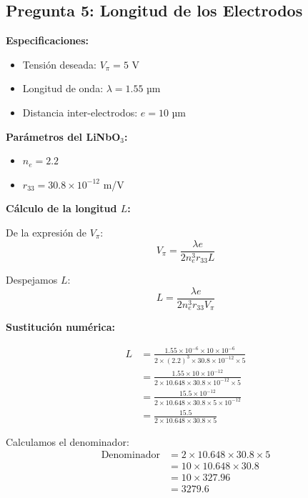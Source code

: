 \documentclass[12pt,a4paper]{article}
\begin{document}
\begin{enumerate}
\subsection{Pregunta 5: Longitud de los Electrodos}

\textbf{Especificaciones:}
\begin{itemize}
    \item Tensión deseada: $V_\pi = 5$ V
    \item Longitud de onda: $\lambda = 1.55$ µm
    \item Distancia inter-electrodos: $e = 10$ µm
\end{itemize}

\textbf{Parámetros del LiNbO$_3$:}
\begin{itemize}
    \item $n_e = 2.2$
    \item $r_{33} = 30.8 \times 10^{-12}$ m/V
\end{itemize}

\textbf{Cálculo de la longitud $L$:}

De la expresión de $V_\pi$:
\begin{equation}
    V_\pi = \frac{\lambda e}{2 n_e^3 r_{33} L}
\end{equation}

Despejamos $L$:
\begin{equation}
    L = \frac{\lambda e}{2 n_e^3 r_{33} V_\pi}
\end{equation}

\textbf{Sustitución numérica:}

\begin{align}
    L &= \frac{1.55 \times 10^{-6} \times 10 \times 10^{-6}}{2 \times (2.2)^3 \times 30.8 \times 10^{-12} \times 5} \\
    &= \frac{1.55 \times 10 \times 10^{-12}}{2 \times 10.648 \times 30.8 \times 10^{-12} \times 5} \\
    &= \frac{15.5 \times 10^{-12}}{2 \times 10.648 \times 30.8 \times 5 \times 10^{-12}} \\
    &= \frac{15.5}{2 \times 10.648 \times 30.8 \times 5}
\end{align}

Calculamos el denominador:
\begin{align}
    \text{Denominador} &= 2 \times 10.648 \times 30.8 \times 5 \\
    &= 10 \times 10.648 \times 30.8 \\
    &= 10 \times 327.96 \\
    &= 3279.6
\end{align}


\end{enumerate}
\end{document}
